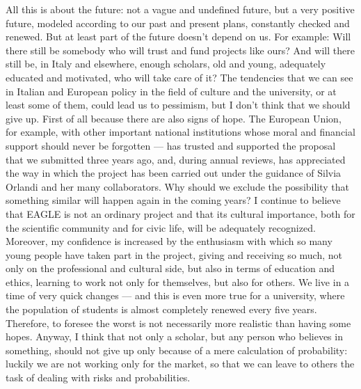 All this is about the future: not a vague and undefined future, but a very positive future, modeled according to our past and present plans, constantly checked and renewed. But at least part of the future doesn’t depend on us.
For example: Will there still be somebody who will trust and fund projects like ours?
And will there still be, in Italy and elsewhere, enough scholars, old and young, adequately educated and motivated, who will take care of it?
The tendencies that we can see in Italian and European policy in the field of culture and the university, or at least some of them, could lead us to pessimism, but I don’t think that we should give up. First of all because there are also signs of hope. The European Union, for example, with other important national institutions whose moral and financial support should never be forgotten --- has trusted and supported the proposal that we submitted three years ago, and, during annual reviews, has appreciated the way in which the project has been carried out under the guidance of Silvia Orlandi and her many collaborators. Why should we exclude the possibility that something similar will happen again in the coming years? I continue to believe that EAGLE is not an ordinary project and that its cultural importance, both for the scientific community and for civic life, will be adequately recognized.
Moreover, my confidence is increased by the enthusiasm with which so many young people have taken part in the project, giving and receiving so much, not only on the professional and cultural side, but also in terms of education and ethics, learning to work not only for themselves, but also for others.
We live in a time of very quick changes --- and this is even more true for a university, where the population of students is almost completely renewed every five years. Therefore, to foresee the worst is not necessarily more realistic than having some hopes.
Anyway, I think that not only a scholar, but any person who believes in something, should not give up only because of a mere calculation of probability: luckily we are not working only for the market, so that we can leave to others the task of dealing with risks and probabilities.


